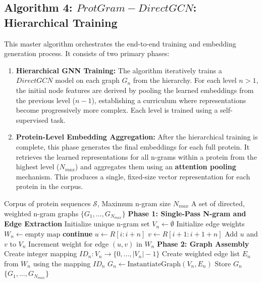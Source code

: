 \documentclass[utf8]{frontiers_suppmat}
\begin{document}
\subsection*{Algorithm 4: \textit{$ProtGram-DirectGCN$}: Hierarchical Training}
This master algorithm orchestrates the end-to-end training and embedding generation process. It consists of two primary phases:
\begin{enumerate}
	\item \textbf{Hierarchical GNN Training:} The algorithm iteratively trains a \textbf{$DirectGCN$} model on each graph $G_n$ from the hierarchy. For each level $n>1$, the initial node features are derived by pooling the learned embeddings from the previous level ($n-1$), establishing a curriculum where representations become progressively more complex. Each level is trained using a self-supervised task.
	\item \textbf{Protein-Level Embedding Aggregation:} After the hierarchical training is complete, this phase generates the final embeddings for each full protein. It retrieves the learned representations for all n-grams within a protein from the highest level ($N_{max}$) and aggregates them using an \textbf{attention pooling} mechanism. This produces a single, fixed-size vector representation for each protein in the corpus.
\end{enumerate}
\begin{algorithm}[H]
	\caption{$ProtGram$: Hierarchical N-gram Graph Construction}
	\label{alg:GraphConstruction}
	\begin{algorithmic}[1]
		\Require Corpus of protein sequences $\mathcal{S}$, Maximum n-gram size $N_{max}$
		\Ensure A set of directed, weighted n-gram graphs $\{G_1, \dots, G_{N_{max}}\}$
		\Statex
		\State \textbf{Phase 1: Single-Pass N-gram and Edge Extraction}
		\State Initialize unique n-gram set $V_n \gets \emptyset$
		\State Initialize edge weights $W_n \gets \text{empty map}$
		 
		\State \textbf{continue}
		\EndIf
		\State $u \gets R[i : i+n]$ 
		\State $v \gets R[i+1 : i+1+n]$ 
		\State Add $u$ and $v$ to $V_n$
		\State Increment weight for edge $(u, v)$ in $W_n$
		\EndFor
		\EndFor
		\Statex
		\State \textbf{Phase 2: Graph Assembly}
		\State Create integer mapping $ID_n: V_n \to \{0, \dots, |V_n|-1\}$
		\State Create weighted edge list $E_n$ from $W_n$ using the mapping $ID_n$
		\State $G_n \gets \text{InstantiateGraph}(V_n, E_n)$
		\State Store $G_n$
		\EndFor
		\State \Return $\{G_1, \dots, G_{N_{max}}\}$
	\end{algorithmic}
\end{algorithm}
\end{document}
